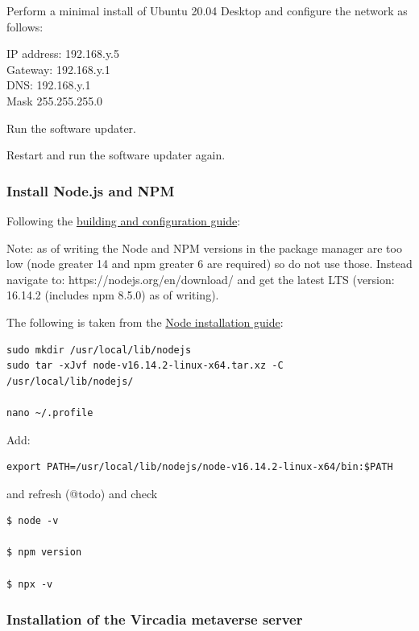 Perform a minimal install of Ubuntu 20.04 Desktop and configure the
network as follows:

IP address: 192.168.y.5\\
Gateway: 192.168.y.1\\
DNS: 192.168.y.1\\
Mask 255.255.255.0

Run the software updater.

Restart and run the software updater again.

\hypertarget{install-node.js-and-npm}{%
\subsubsection{Install Node.js and NPM}\label{install-node.js-and-npm}}

Following the
\href{https://github.com/vircadia/vircadia-metaverse/blob/master/docs/Building.md}{building
and configuration guide}:

Note: as of writing the Node and NPM versions in the package manager are
too low (node greater{} 14 and npm greater{} 6 are required)
so do not use those. Instead navigate to:
https://nodejs.org/en/download/ and get the latest LTS (version: 16.14.2
(includes npm 8.5.0) as of writing).

The following is taken from the
\href{https://github.com/nodejs/help/wiki/Installation}{Node
installation guide}:

\begin{verbatim}
sudo mkdir /usr/local/lib/nodejs
sudo tar -xJvf node-v16.14.2-linux-x64.tar.xz -C /usr/local/lib/nodejs/

nano ~/.profile
\end{verbatim}

Add:

\begin{verbatim}
export PATH=/usr/local/lib/nodejs/node-v16.14.2-linux-x64/bin:$PATH
\end{verbatim}

and refresh (@todo) and check

\begin{verbatim}
$ node -v

$ npm version

$ npx -v
\end{verbatim}

\hypertarget{installation-of-the-vircadia-metaverse-server}{%
\subsubsection{Installation of the Vircadia metaverse
server}\label{installation-of-the-vircadia-metaverse-server}}

